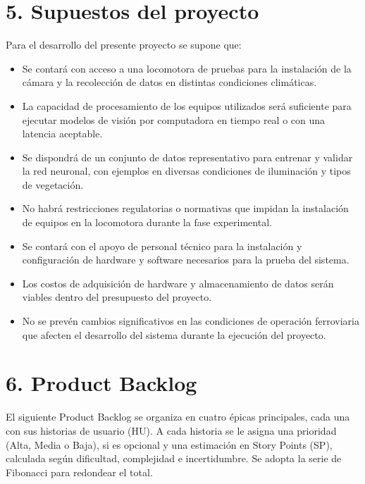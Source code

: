 \documentclass[
11pt, %
]{ProyectoVpC}
\begin{document}
\section{5. Supuestos del proyecto}
\label{sec:supuestos}
Para el desarrollo del presente proyecto se supone que:
\begin{itemize}
\item Se contará con acceso a una locomotora de pruebas para la instalación de la cámara y la recolección de datos en distintas condiciones climáticas.
\item La capacidad de procesamiento de los equipos utilizados será suficiente para ejecutar modelos de visión por computadora en tiempo real o con una latencia aceptable.
\item Se dispondrá de un conjunto de datos representativo para entrenar y validar la red neuronal, con ejemplos en diversas condiciones de iluminación y tipos de vegetación.
\item No habrá restricciones regulatorias o normativas que impidan la instalación de equipos en la locomotora durante la fase experimental.
\item Se contará con el apoyo de personal técnico para la instalación y configuración de hardware y software necesarios para la prueba del sistema.
\item Los costos de adquisición de hardware y almacenamiento de datos serán viables dentro del presupuesto del proyecto.
\item No se prevén cambios significativos en las condiciones de operación ferroviaria que afecten el desarrollo del sistema durante la ejecución del proyecto.
\end{itemize}

\section{6. Product Backlog}
\label{sec:backlog}

El siguiente Product Backlog se organiza en cuatro épicas principales, cada una con sus historias de usuario (HU). A cada historia se le asigna una prioridad (Alta, Media o Baja), si es opcional y una estimación en Story Points (SP), calculada según dificultad, complejidad e incertidumbre. Se adopta la serie de Fibonacci para redondear el total.
\end{document}
